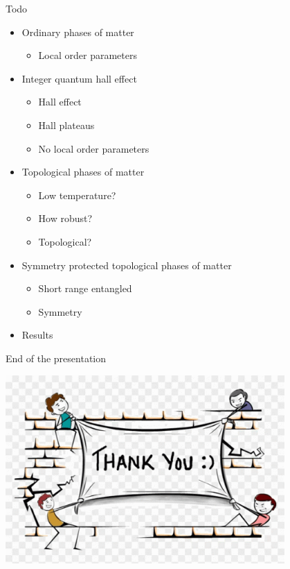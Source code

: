\documentclass{beamer}
\begin{document}
\begin{frame}{Todo}
	\begin{itemize}
		\item[\done] Ordinary phases of matter
		\begin{itemize}
			\item[\done] Local order parameters
		\end{itemize}
		\item[\done] Integer quantum hall effect
		\begin{itemize}
			\item[\done] Hall effect
			\item[\done] Hall plateaus
			\item[\done] No local order parameters
		\end{itemize}
		\item[\done] Topological phases of matter
		\begin{itemize}
			\item[\done] Low temperature?
			\item[\done] How robust?
			\item[\done] Topological?
		\end{itemize}
		\item[\done] Symmetry protected topological phases of matter
		\begin{itemize}
			\item[\done] Short range entangled
			\item[\done] Symmetry
		\end{itemize}
		\item[\done] Results
	\end{itemize}
\end{frame}

\begin{frame}{End of the presentation}
	\begin{center}
		\includegraphics[width=0.8\textwidth]{Images/thank-you.png}
	\end{center}
\end{frame}
\end{document}
